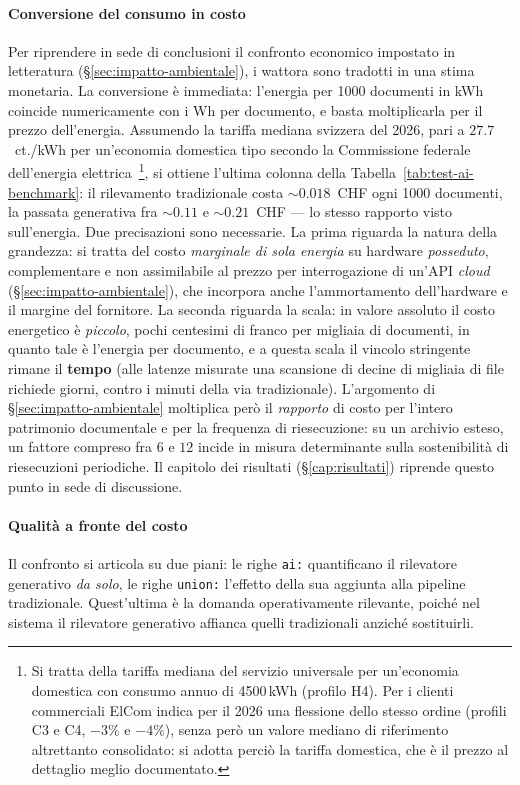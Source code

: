 \paragraph*{Conversione del consumo in costo} Per riprendere in sede di conclusioni il confronto economico impostato in letteratura (§\ref{sec:impatto-ambientale}), i wattora sono tradotti in una stima monetaria. La conversione è immediata: l'energia per 1000 documenti in kWh coincide numericamente con i Wh per documento, e basta moltiplicarla per il prezzo dell'energia. Assumendo la tariffa mediana svizzera del 2026, pari a $27.7$~ct./kWh per un'economia domestica tipo secondo la Commissione federale dell'energia elettrica~\cite{elcomPrezziElettricitaCalo2025}\footnote{Si tratta della tariffa mediana del servizio universale per un'economia domestica con consumo annuo di 4500\,kWh (profilo H4). Per i clienti commerciali ElCom indica per il 2026 una flessione dello stesso ordine (profili C3 e C4, $-3$\% e $-4$\%), senza però un valore mediano di riferimento altrettanto consolidato: si adotta perciò la tariffa domestica, che è il prezzo al dettaglio meglio documentato.}, si ottiene l'ultima colonna della Tabella~\ref{tab:test-ai-benchmark}: il rilevamento tradizionale costa ${\sim}0.018$~CHF ogni 1000 documenti, la passata generativa fra ${\sim}0.11$ e ${\sim}0.21$~CHF --- lo stesso rapporto visto sull'energia. Due precisazioni sono necessarie. La prima riguarda la natura della grandezza: si tratta del costo \emph{marginale di sola energia} su hardware \emph{posseduto}, complementare e non assimilabile al prezzo per interrogazione di un'API \textit{cloud} (§\ref{sec:impatto-ambientale}), che incorpora anche l'ammortamento dell'hardware e il margine del fornitore. La seconda riguarda la scala: in valore assoluto il costo energetico è \emph{piccolo}, pochi centesimi di franco per migliaia di documenti, in quanto tale è l'energia per documento, e a questa scala il vincolo stringente rimane il \textbf{tempo} (alle latenze misurate una scansione di decine di migliaia di file richiede giorni, contro i minuti della via tradizionale). L'argomento di §\ref{sec:impatto-ambientale} moltiplica però il \emph{rapporto} di costo per l'intero patrimonio documentale e per la frequenza di riesecuzione: su un archivio esteso, un fattore compreso fra $6$ e $12$ incide in misura determinante sulla sostenibilità di riesecuzioni periodiche. Il capitolo dei risultati (§\ref{cap:risultati}) riprende questo punto in sede di discussione.

\paragraph*{Qualità a fronte del costo} Il confronto si articola su due piani: le righe \texttt{ai:} quantificano il rilevatore generativo \emph{da solo}, le righe \texttt{union:} l'effetto della sua aggiunta alla pipeline tradizionale. Quest'ultima è la domanda operativamente rilevante, poiché nel sistema il rilevatore generativo affianca quelli tradizionali anziché sostituirli.

